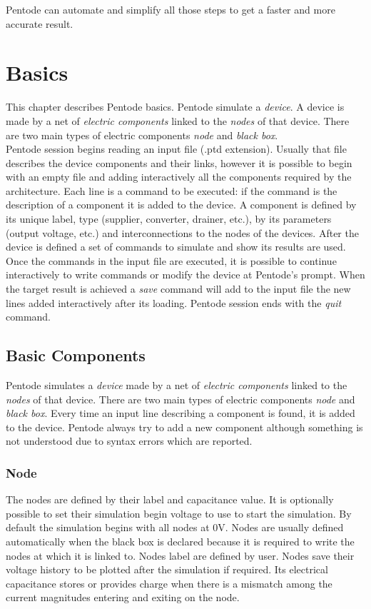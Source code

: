 \documentclass[12pt,a4paper]{book}
\begin{document}
Pentode can automate and simplify all those steps to get a faster and more accurate result.\\
\chapter{Basics}
This chapter describes Pentode basics. Pentode simulate a \emph{device}. A device is  made by a net of \emph{electric components} linked to the \emph{nodes} of that device. There are two main types of electric components \emph{node} and \emph{black box}. \\ 
Pentode session begins reading an input file (.ptd extension). Usually that file describes the device components and their links, however it is possible to begin with an empty file and adding interactively all the components required by the architecture. Each line is a command to be executed: if the command is the description of a component it is added to the device.  A component is defined by its unique label, type (supplier, converter, drainer, etc.), by its parameters (output voltage, etc.) and interconnections to the nodes of the devices. After the device is defined a set of commands to simulate and show its results are used. Once the commands in the input file are executed, it is possible to continue interactively to write commands or modify the device at Pentode's prompt. When the target result is achieved a \emph{save} command will add to the input file the new lines added interactively after its loading. Pentode session ends with the \emph{quit} command.\\
\section{Basic Components}
Pentode simulates a \emph{device} made by a net of \emph{electric components} linked to the \emph{nodes} of that device. There are two main types of electric components \emph{node} and \emph{black box}. Every time an input line describing a component is found, it is added to the device. Pentode always try to add a new component although something is not understood due to syntax errors which are reported.\\
\subsection{Node}
The nodes are defined by their label and capacitance value. It is optionally possible to set their simulation begin voltage to use to start the simulation. By default the simulation begins with all nodes at 0V.  Nodes are usually defined automatically when the black box is declared because it is required to write the nodes at which it is linked to. Nodes label are defined by user. Nodes save their voltage history to be plotted after the simulation if required. Its electrical capacitance stores or provides charge when there is a mismatch among the current magnitudes entering and exiting on the node.\\
\end{document}
